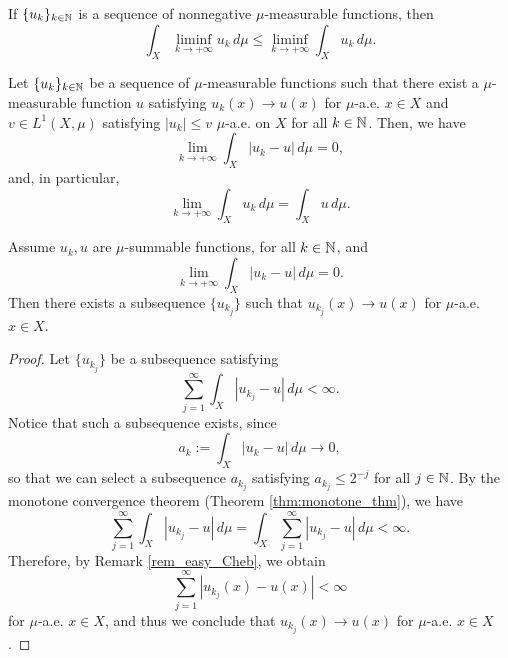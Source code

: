 \begin{theorem} \label{thm:Fatou}
If $\{u_{k}\}_{k \in \mathbb{N}}$ is a sequence of nonnegative $\mu$-measurable functions, then
\begin{equation*}
\int_{X} \liminf_{k \to + \infty} u_{k} \, d \mu \le \liminf_{k \to + \infty} \int_{X} u_{k} \, d \mu.
\end{equation*}
\end{theorem}

\begin{theorem} \label{thm:dominated_convergence}
Let $\{u_{k}\}_{k \in \mathbb{N}}$ be a sequence of $\mu$-measurable functions such that there exist a $\mu$-measurable function $u$ satisfying $u_{k}(x) \to u(x)$ for $\mu$-a.e. $x \in X$ and $v \in L^{1}(X, \mu)$ satisfying $|u_{k}| \le v$ $\mu$-a.e. on $X$ for all $k \in \mathbb{N}$. Then, we have
\begin{equation*}
\lim_{k \to + \infty} \int_{X} |u_{k} - u| \, d \mu = 0,
\end{equation*}
and, in particular,
\begin{equation*}
\lim_{k \to + \infty} \int_{X} u_{k} \, d \mu = \int_{X} u \, d \mu.
\end{equation*}
\end{theorem}

\begin{theorem}
Assume $u_{k}, u$ are $\mu$-summable functions, for all $k \in \mathbb{N}$, and
\begin{equation*}
\lim_{k \to + \infty} \int_{X} |u_{k} - u| \, d \mu = 0.
\end{equation*}
Then there exists a subsequence $\{u_{k_{j}}\}$ such that $u_{k_{j}}(x) \to u(x)$ for $\mu$-a.e. $x \in X$.
\end{theorem}
\begin{proof}
Let $\{u_{k_{j}}\}$ be a subsequence satisfying
\begin{equation*}
\sum_{j = 1}^{\infty} \int_{X} |u_{k_{j}} - u| \, d \mu < \infty.
\end{equation*}
Notice that such a subsequence exists, since 
\begin{equation*}
a_{k} := \int_{X} |u_{k} - u| \, d \mu  \to 0,
\end{equation*}
so that we can select a subsequence $a_{k_{j}}$ satisfying $a_{k_{j}} \le 2^{-j}$ for all $j \in \mathbb{N}$. By the monotone convergence theorem (Theorem \ref{thm:monotone_thm}), we have
\begin{equation*}
\sum_{j = 1}^{\infty} \int_{X} |u_{k_{j}} - u| \, d \mu = \int_{X} \sum_{j = 1}^{\infty} |u_{k_{j}} - u| \, d \mu < \infty.
\end{equation*}
Therefore, by Remark \ref{rem_easy_Cheb}, we obtain 
\begin{equation*}
\sum_{j = 1}^{\infty} |u_{k_{j}}(x) - u(x)| < \infty
\end{equation*}
for $\mu$-a.e. $x \in X$, and thus we conclude that $u_{k_{j}}(x) \to u(x)$ for $\mu$-a.e. $x \in X$.
\end{proof}


